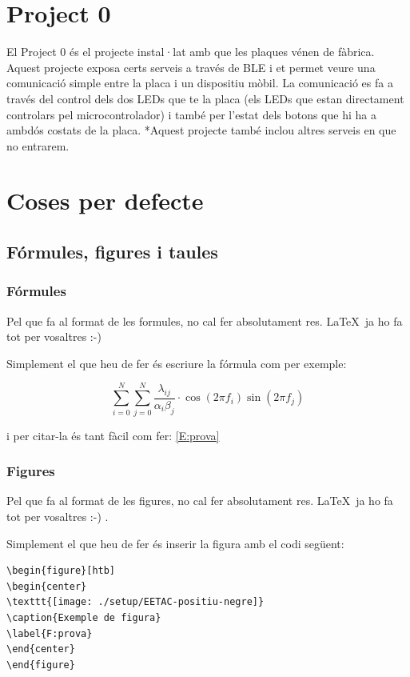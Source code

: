 \section{Project 0}
El Project 0 és el projecte instal·lat amb que les plaques vénen de fàbrica. Aquest projecte exposa certs serveis a través de BLE i et permet veure una comunicació simple entre la placa i un dispositiu mòbil. La comunicació es fa a través del control dels dos LEDs que te la placa (els LEDs que estan directament controlars pel microcontrolador) i també per l'estat dels botons que hi ha a ambdós costats de la placa.
*Aquest projecte també inclou altres serveis en que no entrarem.



\section{Coses per defecte}
\subsection{Fórmules, figures i taules}

\subsubsection{Fórmules}

Pel que fa al format de les formules, no cal fer absolutament res. \LaTeX \ ja ho fa tot per vosaltres :-)  

Simplement el que heu de fer és escriure la fórmula com per exemple:

\begin{equation}\label{E:prova}
\sum _{i=0}^{N} \sum _{j=0}^{N} \frac{\lambda _{ij}}{\alpha _i \beta_ j} \cdot \cos (2\pi f_i) \sin(2 \pi f_j)
\end{equation}

i per citar-la és tant fàcil com fer: \ref{E:prova}

\subsubsection{Figures}

Pel que fa al format de les figures, no cal fer absolutament res. \LaTeX \ ja ho fa tot per vosaltres :-) . 

Simplement el que heu de fer és inserir la figura amb el codi següent:

\begin{verbatim}
\begin{figure}[htb]
\begin{center}
\texttt{[image: ./setup/EETAC-positiu-negre]}
\caption{Exemple de figura}
\label{F:prova}
\end{center}
\end{figure}
\end{verbatim}

